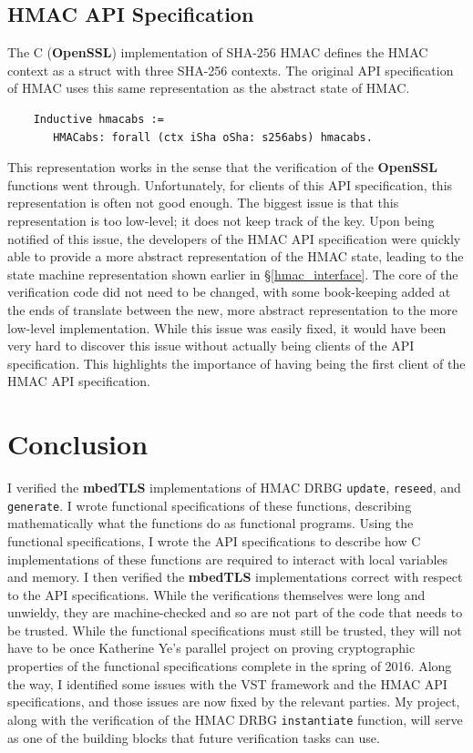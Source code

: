 \documentclass[pageno]{jpaper}
\newcommand{\stdtitle}[1]{\textbf{#1}}
\begin{document}
\subsection{HMAC API Specification} \label{oldhmac}

The C (\stdtitle{OpenSSL}) implementation of SHA-256 HMAC defines the HMAC context as a struct with three SHA-256 contexts. The original API specification of HMAC \cite{hmac} uses this same representation as the abstract state of HMAC.

\begin{lstlisting}
    Inductive hmacabs :=
       HMACabs: forall (ctx iSha oSha: s256abs) hmacabs.
\end{lstlisting}

This representation works in the sense that the verification of the \stdtitle{OpenSSL} functions went through. Unfortunately, for clients of this API specification, this representation is often not good enough. The biggest issue is that this representation is too low-level; it does not keep track of the key. Upon being notified of this issue, the developers of the HMAC API specification were quickly able to provide a more abstract representation of the HMAC state, leading to the state machine representation shown earlier in \S \ref{hmac_interface}. The core of the verification code did not need to be changed, with some book-keeping added at the ends of translate between the new, more abstract representation to the more low-level implementation. While this issue was easily fixed, it would have been very hard to discover this issue without actually being clients of the API specification. This highlights the importance of having being the first client of the HMAC API specification.


\section{Conclusion}

I verified the \stdtitle{mbedTLS} implementations of HMAC DRBG \lstinline{update}, \lstinline{reseed}, and \lstinline{generate}. I wrote functional specifications of these functions, describing mathematically what the functions do as functional programs. Using the functional specifications, I wrote the API specifications to describe how C implementations of these functions are required to interact with local variables and memory. I then verified the \stdtitle{mbedTLS} implementations correct with respect to the API specifications. While the verifications themselves were long and unwieldy, they are machine-checked and so are not part of the code that needs to be trusted. While the functional specifications must still be trusted, they will not have to be once Katherine Ye’s parallel project on proving cryptographic properties of the functional specifications complete in the spring of 2016. Along the way, I identified some issues with the VST framework and the HMAC API specifications, and those issues are now fixed by the relevant parties. My project, along with the verification of the HMAC DRBG \lstinline{instantiate} function, will serve as one of the building blocks that future verification tasks can use.
\end{document}
